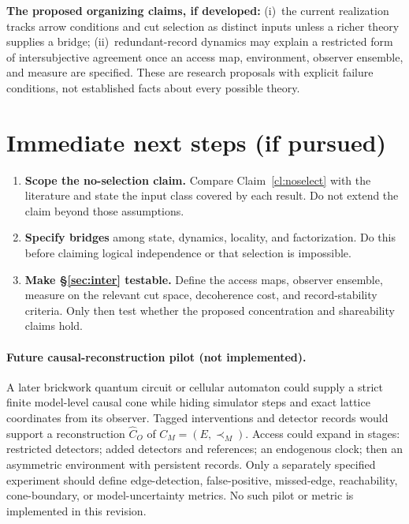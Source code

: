\documentclass[11pt]{article}
\theoremstyle{definition}
\theoremstyle{remark}
\begin{document}
\noindent\textbf{The proposed organizing claims, if developed:} (i)~the current realization tracks arrow conditions and cut selection as distinct inputs unless a richer theory supplies a bridge; (ii)~redundant-record dynamics may explain a restricted form of intersubjective agreement once an access map, environment, observer ensemble, and measure are specified. These are research proposals with explicit failure conditions, not established facts about every possible theory.

\section{Immediate next steps (if pursued)}\label{sec:next}

\begin{enumerate}[leftmargin=1.6em, itemsep=2pt, topsep=3pt]
  \item \textbf{Scope the no-selection claim.} Compare Claim~\ref{cl:noselect} with the literature and state the input class covered by each result. Do not extend the claim beyond those assumptions.
  \item \textbf{Specify bridges} among state, dynamics, locality, and factorization. Do this before claiming logical independence or that selection is impossible.
  \item \textbf{Make \S\ref{sec:inter} testable.} Define the access maps, observer ensemble, measure on the relevant cut space, decoherence cost, and record-stability criteria. Only then test whether the proposed concentration and shareability claims hold.
\end{enumerate}

\paragraph{Future causal-reconstruction pilot (not implemented).}
A later brickwork quantum circuit or cellular automaton could supply a strict finite model-level causal cone while hiding simulator steps and exact lattice coordinates from its observer. Tagged interventions and detector records would support a reconstruction $\widehat C_O$ of $C_M=(E,\prec_M)$. Access could expand in stages: restricted detectors; added detectors and references; an endogenous clock; then an asymmetric environment with persistent records. Only a separately specified experiment should define edge-detection, false-positive, missed-edge, reachability, cone-boundary, or model-uncertainty metrics. No such pilot or metric is implemented in this revision.
\end{document}
